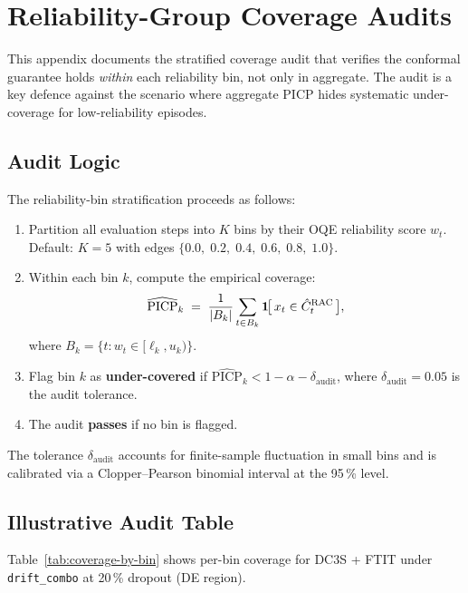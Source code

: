 \chapter{Reliability-Group Coverage Audits}
\label{app:reliability-audits}

This appendix documents the stratified coverage audit that verifies
the conformal guarantee holds \emph{within} each reliability bin, not
only in aggregate.  The audit is a key defence against the scenario
where aggregate PICP hides systematic under-coverage for low-reliability
episodes.

\section{Audit Logic}

The reliability-bin stratification proceeds as follows:
\begin{enumerate}
  \item Partition all evaluation steps into $K$ bins by their OQE
    reliability score $w_t$.  Default: $K=5$ with edges
    $\{0.0,\;0.2,\;0.4,\;0.6,\;0.8,\;1.0\}$.
  \item Within each bin $k$, compute the empirical coverage:
    \[
      \widehat{\mathrm{PICP}}_k
        \;=\; \frac{1}{|B_k|}\sum_{t \in B_k}
              \mathbf{1}\!\bigl[\,x_t \in \hat{C}_t^{\mathrm{RAC}}\,\bigr],
    \]
    where $B_k = \{t : w_t \in [\ell_k, u_k)\}$.
  \item Flag bin $k$ as \textbf{under-covered} if
    $\widehat{\mathrm{PICP}}_k < 1 - \alpha - \delta_{\mathrm{audit}}$,
    where $\delta_{\mathrm{audit}} = 0.05$ is the audit tolerance.
  \item The audit \textbf{passes} if no bin is flagged.
\end{enumerate}

\noindent
The tolerance $\delta_{\mathrm{audit}}$ accounts for finite-sample
fluctuation in small bins and is calibrated via a Clopper--Pearson
binomial interval at the 95\,\% level.

\section{Illustrative Audit Table}

Table~\ref{tab:coverage-by-bin} shows per-bin coverage for DC3S + FTIT
under \texttt{drift\_combo} at 20\,\% dropout (DE region).

